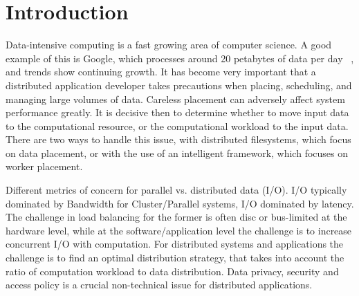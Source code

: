 \documentclass{rspublic}
\newcommand{\micnote}[1]{ {\textcolor{blue} { ***Michael: #1 }}}
\newcommand{\betynote}[1]{ {\textcolor{orange} { ***Bety: #1 }}}
\newcommand{\jhanote}[1]{} \newcommand{\micnote}[1]{}\newcommand{\betynote}[1]{} \newcommand{\fixme}[1]{}
\begin{document}
\section{Introduction} Data-intensive computing is a fast growing area
of computer science. A good example of this is Google, which processes
around 20 petabytes of data per day ~\citep{google}, and trends show
continuing growth. It has become very important that a distributed
application developer takes precautions when placing, scheduling, and
managing large volumes of data. Careless placement can adversely affect
system performance greatly. It is decisive then to determine whether to
move input data to the computational resource, or the computational
workload to the input data. There are two ways to handle this issue,
with distributed filesystems, which focus on data placement, or with the
use of an intelligent framework, which focuses on worker placement. 

\jhanote{refine} Different metrics of concern for parallel
vs. distributed data (I/O).  I/O typically dominated by Bandwidth for
Cluster/Parallel systems, I/O dominated by latency. The challenge in
load balancing for the former is often disc or bus-limited at the
hardware level, while at the software/application level the challenge
is to increase concurrent I/O with computation. For distributed
systems and applications the challenge is to find an optimal
distribution strategy, that takes into account the ratio of
computation workload to data distribution.  Data privacy, security and
access policy is a crucial non-technical issue for distributed
applications.  
\end{document}
